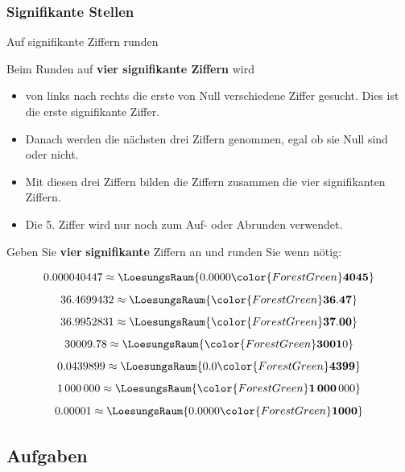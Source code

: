 \newpage

\subsubsection{Signifikante Stellen}
\begin{rezept}{Auf signifikante Ziffern runden}{}
  
  Beim Runden auf \textbf{vier signifikante Ziffern} wird
  \begin{itemize}
  \item  von links nach rechts die erste von Null verschiedene Ziffer gesucht. Dies ist die
    erste signifikante Ziffer.
  \item
    Danach werden die nächsten drei Ziffern
  genommen, egal ob sie Null sind oder nicht. 
\item   Mit diesen drei Ziffern bilden die Ziffern zusammen die vier
  signifikanten Ziffern.
\item  Die 5. Ziffer wird nur noch zum Auf- oder Abrunden verwendet.
  \end{itemize}
\end{rezept}

Geben Sie {\color{ForestGreen}\textbf{vier}} \textbf{signifikante} Ziffern an und runden Sie wenn nötig:

$$0.000040447  \approx \LoesungsRaum{0.0000{\color{ForestGreen}\mathbf{4045}}}$$
$$36.4699432 \approx \LoesungsRaum{{\color{ForestGreen}\mathbf{36.47}}}$$
$$36.9952831 \approx \LoesungsRaum{{\color{ForestGreen}\mathbf{37.00}}}$$
$$30009.78   \approx \LoesungsRaum{{\color{ForestGreen}\mathbf{3001}}0}$$
$$0.0439899  \approx \LoesungsRaum{0.0{\color{ForestGreen}\mathbf{4399}}}$$
$$1\,000\,000 \approx \LoesungsRaum{{\color{ForestGreen}\mathbf{1\,000}}\,000}$$
$$0.00001    \approx \LoesungsRaum{0.0000{\color{ForestGreen}\mathbf{1000}}}$$


\subsection*{Aufgaben}


